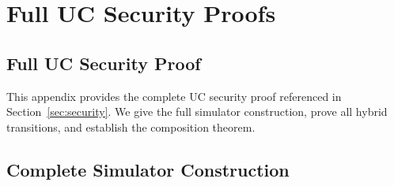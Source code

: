 \section{Full UC Security Proofs}
\label{sec:full-proofs}

\subsection{Full UC Security Proof}
\label{sec:full-proof}

This appendix provides the complete UC security proof referenced in
Section~\ref{sec:security}. We give the full simulator construction, prove
all hybrid transitions, and establish the composition theorem.

\subsection{Complete Simulator Construction}

